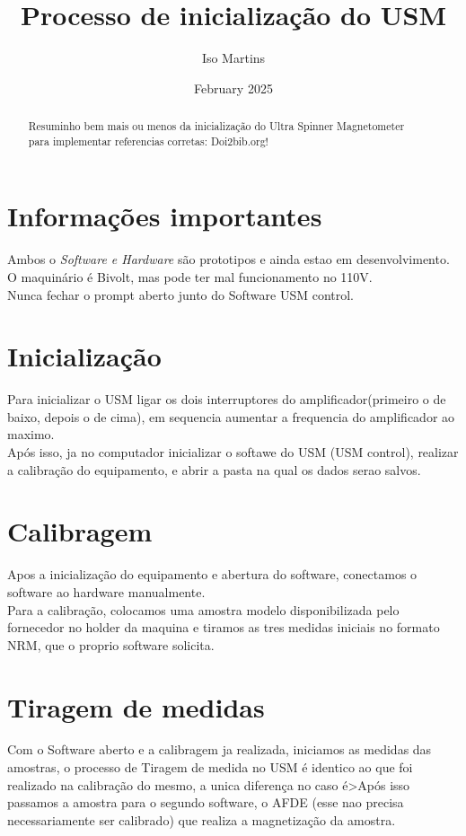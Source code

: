 \documentclass[twocolumn]{paper}
\title{Processo de inicialização do USM}
\author{ Iso Martins }
\date{February 2025}
\begin{document}
\maketitle

\begin{abstract}
  Resuminho bem mais ou menos da inicialização do Ultra Spinner Magnetometer\\
  para implementar referencias corretas: Doi2bib.org!
\end{abstract}

\section{Informações importantes}
Ambos o \emph{Software e Hardware} são prototipos e ainda estao em desenvolvimento.\\
O maquinário é Bivolt, mas pode ter mal funcionamento no 110V.\\
Nunca fechar o prompt aberto junto do Software USM control.\\

\section{Inicialização}
Para inicializar o USM ligar os dois interruptores do amplificador(primeiro o de baixo, depois o de cima), em sequencia aumentar a frequencia do amplificador ao maximo.\\
Após isso, ja no computador inicializar o softawe do USM (USM control), realizar a calibração do equipamento, e abrir a pasta na qual os dados serao salvos.

\section{Calibragem}
Apos a inicialização do equipamento e abertura do software, conectamos o software ao hardware manualmente.\\
Para a calibração, colocamos uma amostra modelo disponibilizada pelo fornecedor no holder da maquina e tiramos as tres medidas iniciais no formato NRM, que o proprio software solicita.

\section{Tiragem de medidas}
Com o Software aberto e a calibragem ja realizada, iniciamos as medidas das amostras, o processo de Tiragem de medida no USM é identico ao que foi realizado na calibração do mesmo, a unica diferença no caso é>Após isso passamos a amostra para o segundo software, o AFDE (esse nao precisa necessariamente ser calibrado) que realiza a magnetização da amostra.
\end{document}
